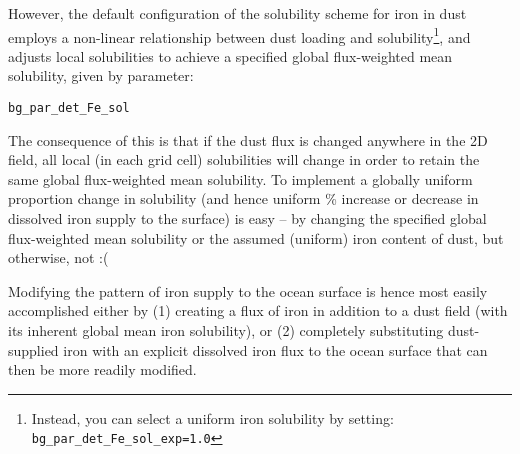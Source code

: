 \documentclass[11pt,fleqn]{book} %
\begin{document}
However, the default configuration of the solubility scheme for iron in dust employs a non-linear relationship between dust loading and solubility\footnote{Instead, you can select a uniform iron solubility by setting: \texttt{bg\_par\_det\_Fe\_sol\_exp=1.0}}, and adjusts local solubilities to achieve a specified global flux-weighted mean solubility, given by parameter:
\vspace{-1mm}\begin{verbatim}
bg_par_det_Fe_sol
\end{verbatim}\vspace{-1mm}
\noindent The consequence of this is that if the dust flux is changed anywhere in the 2D field, all local (in each grid cell) solubilities will change in order to retain the same global flux-weighted mean solubility. To implement a globally uniform proportion change in solubility (and hence uniform \% increase or decrease in dissolved iron supply to the surface) is easy -- by changing the specified global flux-weighted mean solubility or the assumed (uniform) iron content of dust, but otherwise, not :(

Modifying the pattern of iron supply to the ocean surface is hence most easily accomplished either by (1) creating a flux of iron in addition to  a dust field (with its inherent global mean iron solubility), or (2) completely substituting dust-supplied iron with an explicit dissolved iron flux to the ocean surface that can then be more readily modified. 
\end{document}
